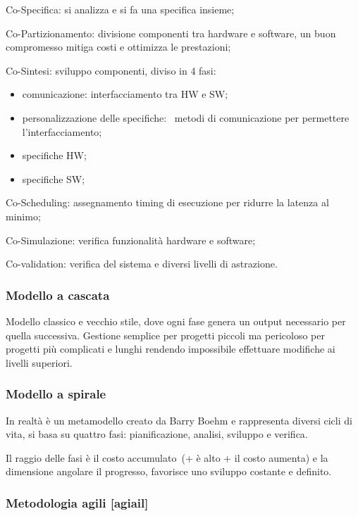 \documentclass[
]{article}
\providecommand{\tightlist}{%
  \setlength{\itemsep}{0pt}\setlength{\parskip}{0pt}}
\begin{document}
{Co-Specifica}{: si analizza e si fa una specifica insieme;}

{Co-Partizionamento}{: divisione componenti tra hardware e software, un
buon compromesso mitiga costi e ottimizza le prestazioni;}

{Co-Sintesi}{: sviluppo componenti, diviso in 4 fasi:}

\begin{itemize}
\tightlist
\item
  {comunicazione}{: interfacciamento tra HW e SW;}
\item
  {personalizzazione delle specifiche}{: ~metodi di comunicazione per
  permettere l'interfacciamento;}
\item
  {specifiche HW;}
\item
  {specifiche SW}{;}
\end{itemize}

{Co-Scheduling}{: assegnamento timing di esecuzione per ridurre la
latenza al minimo;}

{Co-Simulazione}{: verifica funzionalità hardware e software;}

{Co-validation}{: verifica del sistema e diversi livelli di astrazione.}

{}

\subsubsection{\texorpdfstring{{Modello a
cascata}}{Modello a cascata}}\label{h.vbllb6kz6jyd}

{Modello classico e vecchio stile, dove ogni fase genera un output
necessario per quella successiva. Gestione semplice per progetti piccoli
ma pericoloso per progetti più complicati e lunghi rendendo impossibile
effettuare modifiche ai livelli superiori.}

\subsubsection{\texorpdfstring{{Modello a
spirale}}{Modello a spirale}}\label{h.or73hjlu0eeu}

{In realtà è un metamodello creato da Barry Boehm e rappresenta diversi
cicli di vita, si basa su quattro fasi: }{pianificazione, analisi,
sviluppo e verifica}{.}

{Il raggio delle fasi è il costo accumulato}{~(+ è alto + il costo
aumenta) e la dimensione angolare il progresso, favorisce uno sviluppo
costante e definito.}

\subsubsection{\texorpdfstring{{Metodologia agili
}{{[}agiail{]}}}{Metodologia agili {[}agiail{]}}}\label{h.o8zp6d4mhvxb}
\end{document}
